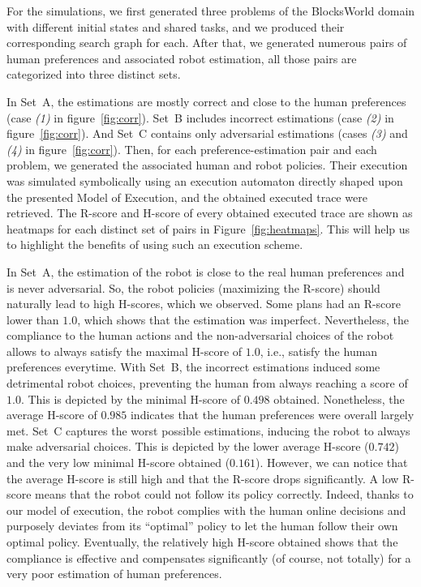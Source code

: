 For the simulations, we first generated three problems of the BlocksWorld domain with different initial states and shared tasks, and we produced their corresponding search graph for each. 
After that, we generated numerous pairs of human preferences and associated robot estimation, all those pairs are categorized into three distinct sets.

In Set~A, the estimations are mostly correct and close to the human preferences (case \textit{(1)} in figure~\ref{fig:corr}). Set~B includes incorrect estimations (case \textit{(2)} in figure~\ref{fig:corr}). And Set~C contains only adversarial estimations (cases \textit{(3)} and \textit{(4)} in figure~\ref{fig:corr}).
Then, for each preference-estimation pair and each problem, we generated the associated human and robot policies. Their execution was simulated symbolically using an execution automaton directly shaped upon the presented Model of Execution, and the obtained executed trace were retrieved.
The R-score and H-score of every obtained executed trace are shown as heatmaps for each distinct set of pairs in Figure~\ref{fig:heatmaps}. This will help us to highlight the benefits of using such an execution scheme.

In Set~A, the estimation of the robot is close to the real human preferences and is never adversarial. So, the robot policies (maximizing the R-score) should naturally lead to high H-scores, which we observed.
Some plans had an R-score lower than $1.0$, which shows that the estimation was imperfect. Nevertheless, the compliance to the human actions and the non-adversarial choices of the robot allows to always satisfy the maximal H-score of $1.0$, i.e., satisfy the human preferences everytime. 
With Set~B, the incorrect estimations induced some detrimental robot choices, preventing the human from always reaching a score of $1.0$. This is depicted by the minimal H-score of $0.498$ obtained. Nonetheless, the average H-score of $0.985$ indicates that the human preferences were overall largely met.
Set~C captures the worst possible estimations, inducing the robot to always make adversarial choices. This is depicted by the lower average H-score ($0.742$) and the very low minimal H-score obtained ($0.161$). 
However, we can notice that the average H-score is still high and that the R-score drops significantly. A low R-score means that the robot could not follow its policy correctly. Indeed, thanks to our model of execution, the robot complies with the human online decisions and purposely deviates from its ``optimal'' policy to let the human follow their own optimal policy. Eventually, the relatively high H-score obtained shows that the compliance is effective and compensates significantly (of course, not totally) for a very poor estimation of human preferences. 

